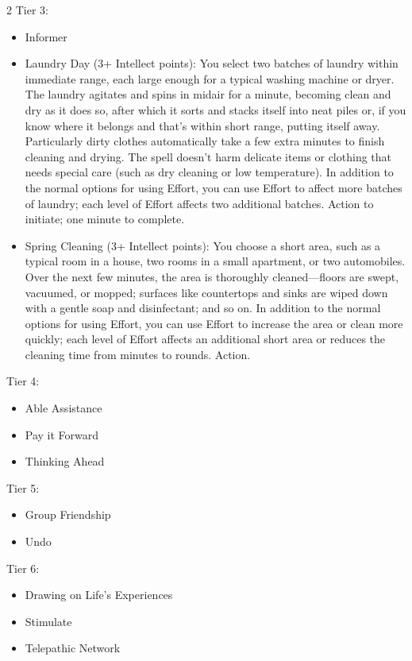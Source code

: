 \begin{multicols}{2}
Tier 3:
\begin{itemize}
\item Informer 
\item Laundry Day (3+ Intellect points): You select two batches of laundry within immediate range, each large enough for a typical washing machine or dryer. The laundry agitates and spins in midair for a minute, becoming clean and dry as it does so, after which it sorts and stacks itself into neat piles or, if you know where it belongs and that’s within short range, putting itself away. Particularly dirty clothes automatically take a few extra minutes to finish cleaning and drying. The spell doesn’t harm delicate items or clothing that needs special care (such as dry cleaning or low temperature). In addition to the normal options for using Effort, you can use Effort to affect more batches of laundry; each level of Effort affects two additional batches. Action to initiate; one minute to complete. 
\item Spring Cleaning (3+ Intellect points): You choose a short area, such as a typical room in a house, two rooms in a small apartment, or two automobiles. Over the next few minutes, the area is thoroughly cleaned—floors are swept, vacuumed, or mopped; surfaces like countertops and sinks are wiped down with a gentle soap and disinfectant; and so on. In addition to the normal options for using Effort, you can use Effort to increase the area or clean more quickly; each level of Effort affects an additional short area or reduces the cleaning time from minutes to rounds. Action. 
\end{itemize}

Tier 4:
\begin{itemize}
\item Able Assistance 
\item Pay it Forward 
\item Thinking Ahead 
\end{itemize}

Tier 5:
\begin{itemize}
\item Group Friendship 
\item Undo
\end{itemize}

Tier 6:
\begin{itemize}
\item Drawing on Life’s Experiences 
\item Stimulate 
\item Telepathic Network
\end{itemize}


\end{multicols}

